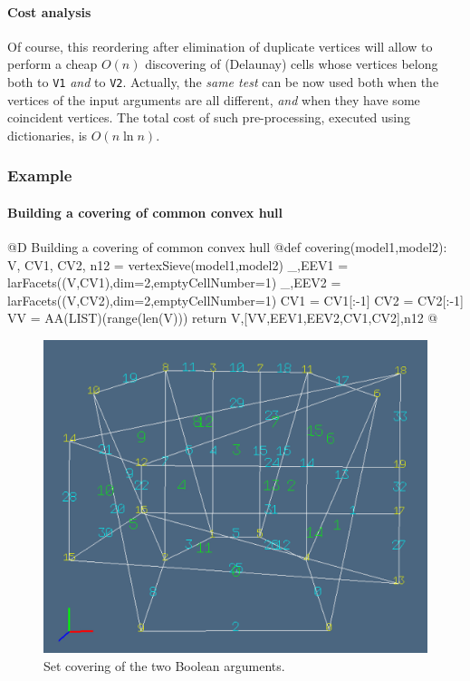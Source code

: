 \documentclass[11pt,oneside]{article}	%
\begin{document}
\paragraph{Cost analysis} 
Of course, this reordering after elimination of duplicate vertices will allow to perform a cheap $O(n)$ discovering of (Delaunay) cells whose vertices belong both to \texttt{V1} \emph{and} to \texttt{V2}. 
Actually, the \emph{same test} can be now used both when the vertices of the input arguments are all different, \emph{and} when they have some coincident vertices.
The total cost of such pre-processing, executed using dictionaries, is $O(n\ln n)$.


\subsubsection{Example}

\paragraph{Building a covering of common convex hull}

@D Building a covering of common convex hull
@{def covering(model1,model2):
	V, CV1, CV2, n12 = vertexSieve(model1,model2)
	_,EEV1 = larFacets((V,CV1),dim=2,emptyCellNumber=1)
	_,EEV2 = larFacets((V,CV2),dim=2,emptyCellNumber=1)
	CV1 = CV1[:-1]
	CV2 = CV2[:-1]
	VV = AA(LIST)(range(len(V)))
	return V,[VV,EEV1,EEV2,CV1,CV2],n12
@}

\begin{figure}[htbp] %
   \centering
   \includegraphics[width=0.6\linewidth]{images/covering} 
   \caption{Set covering of the two Boolean arguments.}
   \label{fig:example}
\end{figure}
\end{document}
